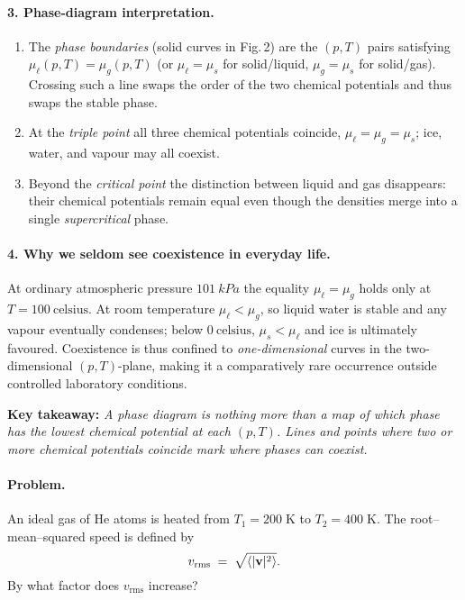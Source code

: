 \documentclass[12pt]{article}
\theoremstyle{definition} %
\theoremstyle{plain} %
\begin{document}
\paragraph{3.  Phase-diagram interpretation.}
\begin{enumerate}[label=\textbf{\arabic*.}, itemsep=0.4em]
  \item The \emph{phase boundaries} (solid curves in Fig.\,2)
        are the \((p,T)\) pairs satisfying
        \(\mu_{\ell}(p,T)=\mu_{g}(p,T)\)
        (or \(\mu_{\ell}=\mu_{s}\) for solid/liquid, \(\mu_{g}=\mu_{s}\) for
        solid/gas).  Crossing such a line swaps the order of the
        two chemical potentials and thus swaps the stable phase.
  \item At the \emph{triple point} all three chemical potentials coincide,
        \(\mu_{\ell}=\mu_{g}=\mu_{s}\); ice, water, and vapour may all
        coexist.
  \item Beyond the \emph{critical point} the distinction between liquid
        and gas disappears: their chemical potentials remain equal even
        though the densities merge into a single \emph{supercritical} phase.
\end{enumerate}

\paragraph{4.  Why we seldom see coexistence in everyday life.}
At ordinary atmospheric pressure $\SI{101}{kPa}$ the equality
\(\mu_{\ell}=\mu_{g}\) holds only at \(T=\SI{100}{\text{celsius} }\).
At room temperature \(\mu_{\ell}<\mu_{g}\), so liquid water is stable and
any vapour eventually condenses; below $\SI{0}{\text{celsius} }$,
\(\mu_{s}<\mu_{\ell}\) and ice is ultimately favoured.
Coexistence is thus confined to
\emph{one-dimensional} curves in the two-dimensional \((p,T)\)-plane,
making it a comparatively rare occurrence outside controlled
laboratory conditions.

\bigskip
\noindent
\textbf{Key takeaway:} \emph{A phase diagram is nothing more than a map
of which phase has the lowest chemical potential at each \((p,T)\).
Lines and points where two or more chemical potentials coincide mark
where phases can coexist.}
\paragraph{Problem.}
An ideal gas of He atoms is heated from \(T_1 = 200\;\mathrm{K}\) to \(T_2 = 400\;\mathrm{K}\).
The root–mean–squared speed is defined by
\[
  v_{\mathrm{rms}}
  \;=\;
  \sqrt{\langle |{\bf v}|^{2}\rangle }.
\]
By what factor does \(v_{\mathrm{rms}}\) increase?
\end{document}
